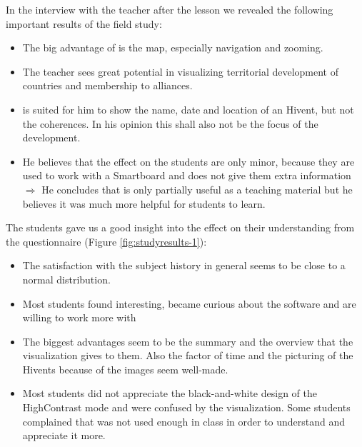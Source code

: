 In the interview with the teacher after the lesson we revealed the following important results of the field study:

\begin{itemize}
  \item The big advantage of \HG is the map, especially navigation and zooming.
  \item The teacher sees great potential in visualizing territorial development of countries and membership to alliances.
  \item \HG is suited for him to show the name, date and location of an Hivent, but not the coherences. In his opinion this shall also not be the focus of the development.
  \item He believes that the effect on the students are only minor, because they are used to work with a Smartboard and \HG does not give them extra information \\[0.8em]
  $\Rightarrow$ He concludes that \HG is only partially useful as a teaching material but he believes it was much more helpful for students to learn.
\end{itemize}

The students gave us a good insight into the effect on their understanding from the questionnaire (Figure \ref{fig:studyresults-1}):

\begin{itemize}
  \item The satisfaction with the subject history in general seems to be close to a normal distribution.
  \item Most students found \HG interesting, became curious about the software and are willing to work more with \HG
  \item The biggest advantages seem to be the summary and the overview that the visualization gives to them. Also the factor of time and the picturing of the Hivents because of the images seem well-made.
  \item Most students did not appreciate the black-and-white design of the HighContrast mode and were confused by the visualization. Some students complained that \HG was not used enough in class in order to understand and appreciate it more.
\end{itemize}


